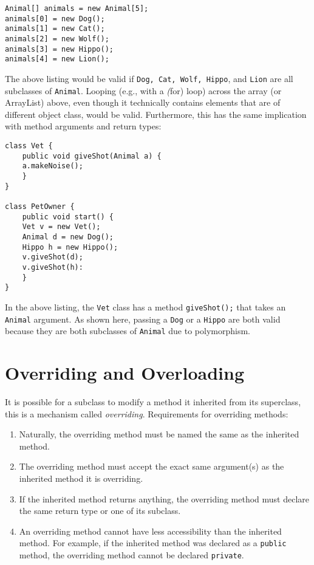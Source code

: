 \documentclass{tufte-handout}
\begin{document}
    \begin{lstlisting}
Animal[] animals = new Animal[5];
animals[0] = new Dog();
animals[1] = new Cat();
animals[2] = new Wolf();
animals[3] = new Hippo();
animals[4] = new Lion();
    \end{lstlisting}

    The above listing would be valid if \texttt{Dog, Cat, Wolf, Hippo}, and \texttt{Lion} are all subclasses of \texttt{Animal}. Looping (e.g., with a \emph(for) loop) across the array (or ArrayList) above, even though it technically contains elements that are of different object class, would be valid. Furthermore, this has the same implication with method arguments and return types:

    \begin{lstlisting}
class Vet {
    public void giveShot(Animal a) {
    a.makeNoise();
    }
}

class PetOwner {
    public void start() {
    Vet v = new Vet();
    Animal d = new Dog();
    Hippo h = new Hippo();
    v.giveShot(d);
    v.giveShot(h):
    }
}
    \end{lstlisting}

    In the above listing, the \texttt{Vet} class has a method \texttt{giveShot();} that takes an \texttt{Animal} argument. As shown here, passing a \texttt{Dog} or a \texttt{Hippo} are both valid because they are both subclasses of \texttt{Animal} due to polymorphism. 

    \section*{Overriding and Overloading}
    It is possible for a subclass to modify a method it inherited from its superclass, this is a mechanism called \emph{overriding}. Requirements for overriding methods:

    \begin{enumerate}
        \item Naturally, the overriding method must be named the same as the inherited method.
        \item The overriding method must accept the exact same argument(s) as the inherited method it is overriding.
        \item If the inherited method returns anything, the overriding method must declare the same return type or one of its subclass.
        \item An overriding method cannot have less accessibility than the inherited method. For example, if the inherited method was declared as a \texttt{public} method, the overriding method cannot be declared \texttt{private}.
    \end{enumerate}
\end{document}
